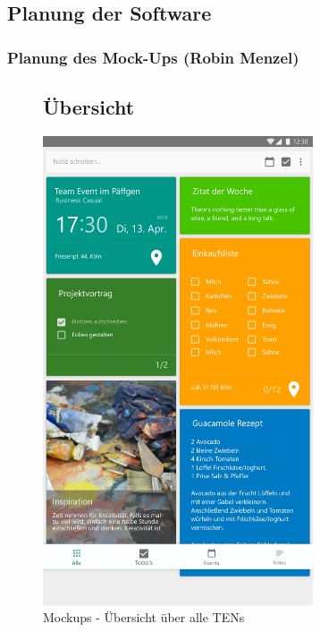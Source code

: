 \newpage
\subsection{Planung der Software}
\subsubsection{Planung des Mock-Ups (Robin Menzel)}
\begin{figure}[H]
	\subsection*{Übersicht}
	\centering
	\includegraphics[width=8cm]{img/OverviewActivity.pdf}
	\caption{Mockups - Übersicht über alle TENs}
	\label{img:OverviewActivity}
\end{figure}


